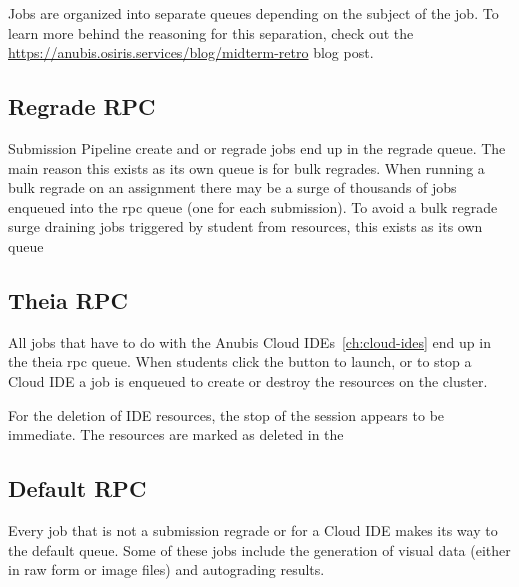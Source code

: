 Jobs are organized into separate queues depending on the subject of the job.
To learn more behind the reasoning for this separation, check out the
\href{Spring 2021 Midterm Retro}{https://anubis.osiris.services/blog/midterm-retro}
blog post.

\subsection{Regrade RPC}\label{subsec:regrade-rpc}

Submission Pipeline create and or regrade jobs end up in the regrade queue.
The main reason this exists as its own queue is for bulk regrades.
When running a bulk regrade on an assignment there may be a surge of thousands of
jobs enqueued into the rpc queue (one for each submission).
To avoid a bulk regrade surge draining jobs triggered by student from resources,
this exists as its own queue

\subsection{Theia RPC}\label{subsec:theia-rpc}

All jobs that have to do with the Anubis Cloud IDEs~\ref{ch:cloud-ides} end up in the theia rpc queue.
When students click the button to launch, or to stop a Cloud IDE a job is enqueued to create or destroy 
the resources on the cluster.

For the deletion of IDE resources, the stop of the session appears to be immediate.
The resources are marked as deleted in the 

\subsection{Default RPC}\label{subsec:default-rpc}

Every job that is not a submission regrade or for a Cloud IDE makes its way to the default queue.
Some of these jobs include the generation of visual data (either in raw form or image files) and
autograding results.